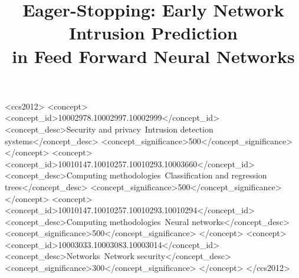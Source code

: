 \documentclass[9pt,sigconf,letterpaper,dvipsnames\ifx\removeHeaders\tempYes ,nonacm\fi]{acmart}
\begin{document}
\title{Eager-Stopping: Early Network Intrusion Prediction\\in Feed Forward Neural Networks}



\begin{abstract}
	
\end{abstract}

\ifx\removeHeaders\tempNo
	\begin{CCSXML}
		<ccs2012>
		<concept>
		<concept_id>10002978.10002997.10002999</concept_id>
		<concept_desc>Security and privacy~Intrusion detection systems</concept_desc>
		<concept_significance>500</concept_significance>
		</concept>
		<concept>
		<concept_id>10010147.10010257.10010293.10003660</concept_id>
		<concept_desc>Computing methodologies~Classification and regression trees</concept_desc>
		<concept_significance>500</concept_significance>
		</concept>
		<concept>
		<concept_id>10010147.10010257.10010293.10010294</concept_id>
		<concept_desc>Computing methodologies~Neural networks</concept_desc>
		<concept_significance>500</concept_significance>
		</concept>
		<concept>
		<concept_id>10003033.10003083.10003014</concept_id>
		<concept_desc>Networks~Network security</concept_desc>
		<concept_significance>300</concept_significance>
		</concept>
		</ccs2012>
	\end{CCSXML}
\fi


\end{document}
